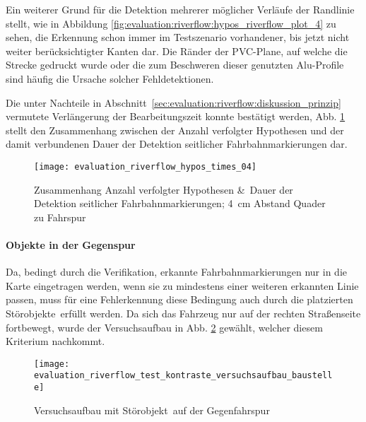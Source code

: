Ein weiterer Grund für die Detektion mehrerer möglicher Verläufe der Randlinie stellt, wie in Abbildung \ref{fig:evaluation:riverflow:hypos_riverflow_plot_4} zu sehen, die Erkennung schon immer im Testszenario vorhandener, bis jetzt nicht weiter berücksichtigter Kanten dar. Die Ränder der PVC-Plane, auf welche die Strecke gedruckt wurde oder die zum Beschweren dieser genutzten Alu-Profile sind häufig die Ursache solcher Fehldetektionen.

Die unter Nachteile in Abschnitt~\ref{sec:evaluation:riverflow:diskussion_prinzip} vermutete Verlängerung der Bearbeitungszeit konnte bestätigt werden, Abb. \ref{evaluation:riverflow:hypos:times_04} stellt den Zusammenhang zwischen der Anzahl verfolgter Hypothesen und der damit verbundenen Dauer der Detektion seitlicher Fahrbahnmarkierungen dar.

\begin{figure}[htbp] %
\centering
\texttt{[image: evaluation\_riverflow\_hypos\_times\_04]}
\caption{Zusammenhang Anzahl verfolgter Hypothesen \&\ Dauer der Detektion seitlicher Fahrbahnmarkierungen; \SI{4}{cm} Abstand Quader zu Fahrspur}
\label{evaluation:riverflow:hypos:times_04}
\end{figure}

\paragraph{Objekte in der Gegenspur}
Da, bedingt durch die Verifikation, erkannte Fahrbahnmarkierungen nur in die Karte eingetragen werden, wenn sie zu mindestens einer weiteren erkannten Linie passen, muss für eine Fehlerkennung diese Bedingung auch durch die platzierten \glqq Störobjekte\grqq\ erfüllt werden. Da sich das Fahrzeug nur auf der rechten Straßenseite fortbewegt, wurde der Versuchsaufbau in Abb. \ref{fig:evaluation:riverflow:test_kontraste_versuchsaufbau_baustelle} gewählt, welcher diesem Kriterium nachkommt.
\begin{figure}[htbp] %
\centering
\texttt{[image: evaluation\_riverflow\_test\_kontraste\_versuchsaufbau\_baustelle]}
\caption{Versuchsaufbau mit \glqq Störobjekt\grqq\ auf der Gegenfahrspur}
\label{fig:evaluation:riverflow:test_kontraste_versuchsaufbau_baustelle}
\end{figure}

